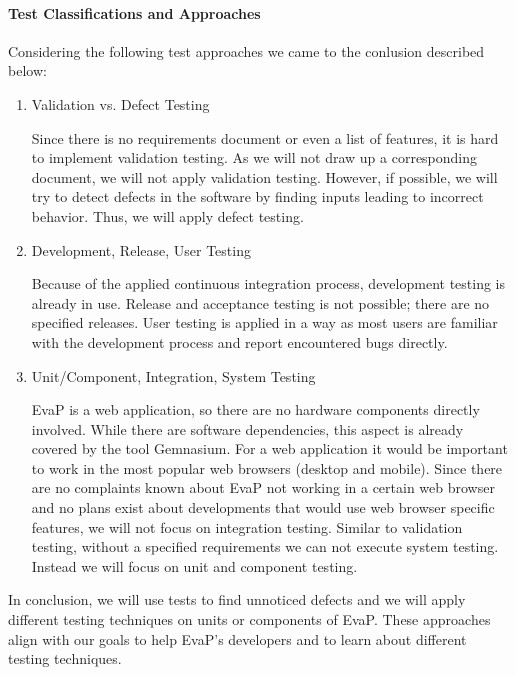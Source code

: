 \paragraph{Test Classifications and Approaches}
Considering the following test approaches we came to the conlusion described below:
\begin{enumerate}
    \item Validation vs. Defect Testing
    
    Since there is no requirements document or even a list of features, it is hard to implement validation testing.
    As we will not draw up a corresponding document, we will not apply validation testing.
    However, if possible, we will try to detect defects in the software by finding inputs leading to incorrect behavior.
    Thus, we will apply defect testing.

    \item Development, Release, User Testing 
    
    Because of the applied continuous integration process, development testing is already in use.
    Release and acceptance testing is not possible; there are no specified releases.
    User testing is applied in a way as most users are familiar with the development process and report encountered bugs directly.

    \item Unit/Component, Integration, System Testing
    
    EvaP is a web application, so there are no hardware components directly involved.
    While there are software dependencies, this aspect is already covered by the tool Gemnasium.
    For a web application it would be important to work in the most popular web browsers (desktop and mobile).
    Since there are no complaints known about EvaP not working in a certain web browser and no plans exist about developments that would use web browser specific features, we will not focus on integration testing.
    Similar to validation testing, without a specified requirements we can not execute system testing.
    Instead we will focus on unit and component testing. 
\end{enumerate}
In conclusion, we will use tests to find unnoticed defects and we will apply different testing techniques on units or components of EvaP.
These approaches align with our goals to help EvaP's developers and to learn about different testing techniques.

